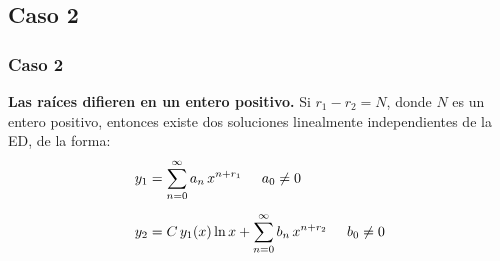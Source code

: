 \subsection*{Caso 2}
\begin{frame}
\frametitle{Caso 2}
\textbf{Las raíces difieren en un entero positivo.} Si $r_{1} - r_{2} = N$, donde $N$ es un entero positivo, entonces existe dos soluciones linealmente independientes de la ED, de la forma:
\begin{subequations}
\begin{align}
y_{1} &= \sum_{n=0}^{\infty} a_{n} \, x^{n+r_{1}} \hspace{0.5cm} a_{0} \neq 0 \label{eq:ecuacion_20a} \\[0.5em]
y_{2} &= C \, y_{1} (x) \ln x + \sum_{n=0}^{\infty} b_{n} \, x^{n+r_{2}} \hspace{0.5cm} b_{0} \neq 0 \label{eq:ecuacion_20b}
\end{align}
\end{subequations}
\end{frame}
